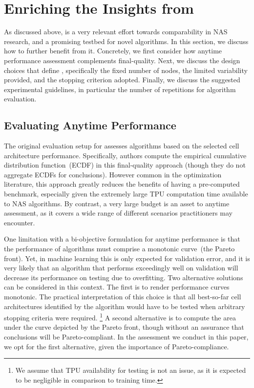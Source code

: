 \section{Enriching the Insights from \nasbench}
\label{sec:guidelines}

As discussed above, \nasbench is a very relevant effort towards comparability in NAS research, and a promising testbed for novel algorithms. In this section, we discuss how to further benefit from it. Concretely, we first consider how anytime performance assessment complements final-quality. Next, we discuss the design choices that define \nasbench, specifically the fixed number of nodes, the limited variability provided, and the stopping criterion adopted. Finally, we discuss the suggested experimental guidelines, in particular the number of repetitions for algorithm evaluation.

\subsection{Evaluating Anytime Performance}
The original evaluation setup for \nasbench assesses algorithms based on the selected cell architecture performance. Specifically, authors compute the empirical cumulative distribution function~(ECDF) in this final-quality approach (though they do not aggregate ECDFs for conclusions). However common in the optimization literature, this approach greatly reduces the benefits of having a pre-computed benchmark, especially given the extremely large TPU computation time available to NAS algorithms. By contrast, a very large budget is an asset to anytime assessment, as it covers a wide range of different scenarios practitioners may encounter.

One limitation with a bi-objective formulation for anytime performance is that the performance of algorithms must comprise a monotonic curve~(the Pareto front). Yet, in machine learning this is only expected for validation error, and it is very likely that an algorithm that performs exceedingly well on validation will decrease its performance on testing due to overfitting. Two alternative solutions can be considered in this context. The first is to render performance curves monotonic. The practical interpretation of this choice is that all best-so-far cell architectures identified by the algorithm would have to be tested when arbitrary stopping criteria were required.%
\footnote{We assume that TPU availability for testing is not an issue, as it is expected to be negligible in comparison to training time.} 
A second alternative is to compute the area under the curve depicted by the Pareto front, though without an assurance that conclusions will be Pareto-compliant. In the assessment we conduct in this paper, we opt for the first alternative, given the importance of Pareto-compliance.

